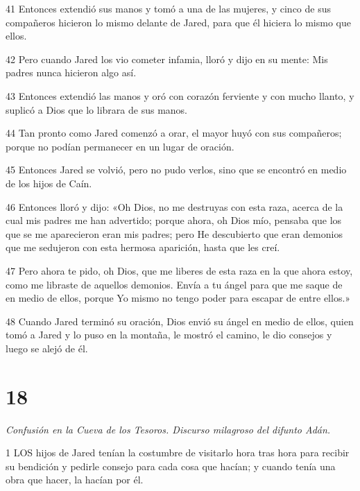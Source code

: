 \par 41 Entonces extendió sus manos y tomó a una de las mujeres, y cinco de sus compañeros hicieron lo mismo delante de Jared, para que él hiciera lo mismo que ellos.

\par 42 Pero cuando Jared los vio cometer infamia, lloró y dijo en su mente: Mis padres nunca hicieron algo así.

\par 43 Entonces extendió las manos y oró con corazón ferviente y con mucho llanto, y suplicó a Dios que lo librara de sus manos.

\par 44 Tan pronto como Jared comenzó a orar, el mayor huyó con sus compañeros; porque no podían permanecer en un lugar de oración.

\par 45 Entonces Jared se volvió, pero no pudo verlos, sino que se encontró en medio de los hijos de Caín.

\par 46 Entonces lloró y dijo: «Oh Dios, no me destruyas con esta raza, acerca de la cual mis padres me han advertido; porque ahora, oh Dios mío, pensaba que los que se me aparecieron eran mis padres; pero He descubierto que eran demonios que me sedujeron con esta hermosa aparición, hasta que les creí.

\par 47 Pero ahora te pido, oh Dios, que me liberes de esta raza en la que ahora estoy, como me libraste de aquellos demonios. Envía a tu ángel para que me saque de en medio de ellos, porque Yo mismo no tengo poder para escapar de entre ellos.»

\par 48 Cuando Jared terminó su oración, Dios envió su ángel en medio de ellos, quien tomó a Jared y lo puso en la montaña, le mostró el camino, le dio consejos y luego se alejó de él.

\chapter{18}

\par \textit{Confusión en la Cueva de los Tesoros. Discurso milagroso del difunto Adán.}

\par 1 LOS hijos de Jared tenían la costumbre de visitarlo hora tras hora para recibir su bendición y pedirle consejo para cada cosa que hacían; y cuando tenía una obra que hacer, la hacían por él.

